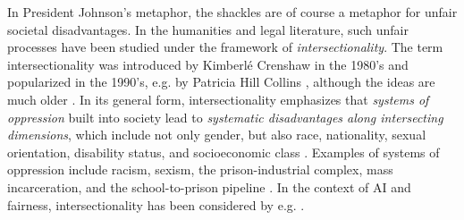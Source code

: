 \documentclass[11pt,dvipdfm]{article}
\begin{document}
In President Johnson's metaphor, the shackles are of course a metaphor for unfair societal disadvantages.  In the humanities and legal literature, such unfair processes have been studied under the framework of \emph{intersectionality}.  %
The term intersectionality was introduced by  Kimberl\'e Crenshaw in the 1980's \cite{crenshaw1989demarginalizing} and popularized in the 1990's, e.g. by Patricia Hill Collins \cite{collins2002black}, although the ideas are much older \cite{collective1977black,truth1851aint}.  
In its general form, intersectionality emphasizes that \emph{systems of oppression} built into society lead to \emph{systematic disadvantages along intersecting dimensions}, which include not only gender, but also race, nationality, sexual orientation, disability status, and socioeconomic class \cite{collective1977black,collins2002black,crenshaw1989demarginalizing,hooks1981ain,lorde1984age,truth1851aint}.  
%
Examples of systems of oppression include racism, sexism, the prison-industrial complex, mass incarceration, and the school-to-prison pipeline \cite{davis2011prisons,alexander2012new}.   
In the context of AI and fairness, intersectionality has been considered by e.g. \cite{buolamwini2018gender,noble2018algorithms, foulds2020intersectional, foulds2020bayesian}.  
%
\end{document}
